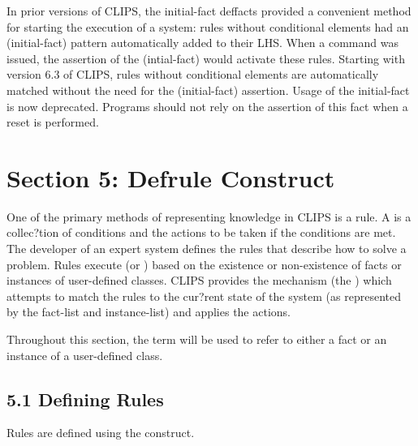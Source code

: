 \documentclass[letterpaper,10pt,english]{sphinxmanual}
\begin{document}
\begin{sphinxVerbatim}[commandchars=\\\{\}]
 
 
\end{sphinxVerbatim}

In prior versions of CLIPS, the initial-fact deffacts provided a
convenient method for starting the execution of a system: rules without
conditional elements had an (initial-fact) pattern automatically added
to their LHS. When a  command was issued, the assertion of the
(intial-fact) would activate these rules. Starting with version 6.3 of
CLIPS, rules without conditional elements are automatically matched
without the need for the (initial-fact) assertion. Usage of the
initial-fact is now deprecated. Programs should not rely on the
assertion of this fact when a reset is performed.

\label{\detokenize{deffacts:section-2}}

\chapter{Section 5: Defrule Construct}
\label{\detokenize{defrule:section-5-defrule-construct}}\label{\detokenize{defrule::doc}}
One of the primary methods of representing knowledge in CLIPS is a rule.
A  is a collec?tion of conditions and the actions to be taken if
the conditions are met. The developer of an expert system defines the
rules that describe how to solve a problem. Rules execute (or )
based on the existence or non-existence of facts or instances of
user-defined classes. CLIPS provides the mechanism (the ) which attempts to match the rules to the cur?rent state of the
system (as represented by the fact-list and instance-list) and applies
the actions.

Throughout this section, the term  will be used to
refer to either a fact or an instance of a user-defined class.


\section{5.1 Defining Rules}
\label{\detokenize{defrule:defining-rules}}
Rules are defined using the  construct.
\end{document}
